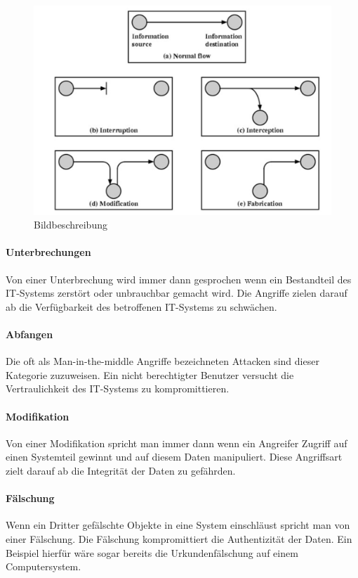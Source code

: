 \documentclass[utf8,biblatex]{lni}
\begin{document}
\begin{figure}
    \centering
    \includegraphics[width=\textwidth]{images/angriffe_pic1.png}
    \caption[Beschreibung für Inhaltsverzeichnis]{Bildbeschreibung} 
    \label{Referenz}
\end{figure} 

\paragraph{Unterbrechungen}
Von einer Unterbrechung wird immer dann gesprochen wenn ein Bestandteil des 
IT-Systems zerstört oder unbrauchbar gemacht wird. Die Angriffe zielen darauf 
ab die Verfügbarkeit des betroffenen IT-Systems zu schwächen. 

\paragraph{Abfangen}
Die oft als \glqq Man-in-the-middle \grqq{} Angriffe bezeichneten Attacken sind dieser 
Kategorie zuzuweisen. Ein nicht berechtigter Benutzer versucht die Vertraulichkeit des 
IT-Systems zu kompromittieren.  

\paragraph{Modifikation}
Von einer Modifikation spricht man immer dann wenn ein Angreifer Zugriff auf einen 
Systemteil gewinnt und auf diesem Daten manipuliert. Diese Angriffsart zielt 
darauf ab die Integrität der Daten zu gefährden. 

\paragraph{Fälschung}
Wenn ein Dritter gefälschte Objekte in eine System einschläust spricht man von 
einer Fälschung. Die Fälschung kompromittiert die Authentizität der Daten. 
Ein Beispiel hierfür wäre sogar bereits die Urkundenfälschung auf einem Computersystem. 
\end{document}
